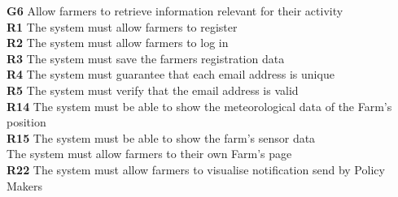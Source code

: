 \textbf{G6} Allow farmers to retrieve information relevant for their activity\\
    \textbf{R1} The system must allow farmers to register\\
    \textbf{R2} The system must allow farmers to log in\\
    \textbf{R3} The system must save the farmers registration data\\
    \textbf{R4} The system must guarantee that each email address is unique\\
    \textbf{R5} The system must verify that the email address is valid\\
    \textbf{R14} The system must be able to show the meteorological data of the Farm’s position\\
    \textbf{R15} The system must be able to show the farm’s sensor data\\
    \textbf{} The system must allow farmers to their own Farm's page\\
    \textbf{R22} The system must allow farmers to visualise notification send by Policy Makers\\
    \textbf{}
    \textbf{}
    \textbf{}
    \textbf{}
    \textbf{}
    \textbf{}
    \textbf{}
    
